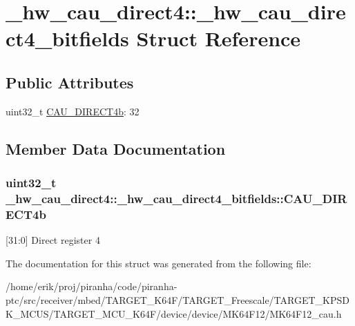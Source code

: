 \hypertarget{struct__hw__cau__direct4_1_1__hw__cau__direct4__bitfields}{}\section{\+\_\+hw\+\_\+cau\+\_\+direct4\+:\+:\+\_\+hw\+\_\+cau\+\_\+direct4\+\_\+bitfields Struct Reference}
\label{struct__hw__cau__direct4_1_1__hw__cau__direct4__bitfields}
\subsection*{Public Attributes}
\begin{DoxyCompactItemize}
\item 
uint32\+\_\+t \hyperlink{struct__hw__cau__direct4_1_1__hw__cau__direct4__bitfields_a29e92f84c94ac18958e69d320ebb4a3c}{C\+A\+U\+\_\+\+D\+I\+R\+E\+C\+T4b}\+: 32
\end{DoxyCompactItemize}


\subsection{Member Data Documentation}
\subsubsection[{\texorpdfstring{C\+A\+U\+\_\+\+D\+I\+R\+E\+C\+T4b}{CAU_DIRECT4b}}]{\setlength{\rightskip}{0pt plus 5cm}uint32\+\_\+t \+\_\+hw\+\_\+cau\+\_\+direct4\+::\+\_\+hw\+\_\+cau\+\_\+direct4\+\_\+bitfields\+::\+C\+A\+U\+\_\+\+D\+I\+R\+E\+C\+T4b}\hypertarget{struct__hw__cau__direct4_1_1__hw__cau__direct4__bitfields_a29e92f84c94ac18958e69d320ebb4a3c}{}\label{struct__hw__cau__direct4_1_1__hw__cau__direct4__bitfields_a29e92f84c94ac18958e69d320ebb4a3c}
\mbox{[}31\+:0\mbox{]} Direct register 4 

The documentation for this struct was generated from the following file\+:\begin{DoxyCompactItemize}
\item 
/home/erik/proj/piranha/code/piranha-\/ptc/src/receiver/mbed/\+T\+A\+R\+G\+E\+T\+\_\+\+K64\+F/\+T\+A\+R\+G\+E\+T\+\_\+\+Freescale/\+T\+A\+R\+G\+E\+T\+\_\+\+K\+P\+S\+D\+K\+\_\+\+M\+C\+U\+S/\+T\+A\+R\+G\+E\+T\+\_\+\+M\+C\+U\+\_\+\+K64\+F/device/device/\+M\+K64\+F12/M\+K64\+F12\+\_\+cau.\+h\end{DoxyCompactItemize}
